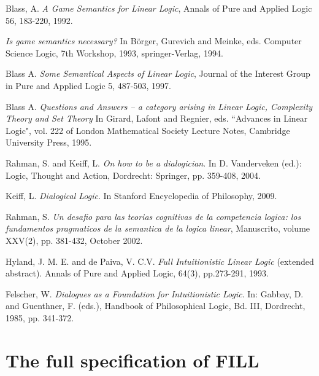 \documentclass{article}
\begin{document}


%
%



 \begin{thebibliography}{000}


 Blass, A. {\it A Game Semantics for Linear Logic}, Annals of Pure and 
Applied Logic 56, 183-220, 1992. 

 {\it Is game semantics necessary?} In B\"orger, Gurevich and Meinke, eds. Computer Science Logic, 7th Workshop, 1993, springer-Verlag, 1994.

 Blass A. {\it Some Semantical Aspects of Linear Logic}, Journal of the 
Interest Group in Pure and Applied Logic 5, 487-503, 1997.

  Blass A. {\it Questions and Answers -- a category arising in Linear Logic, Complexity Theory and Set Theory} In Girard, Lafont and Regnier,  eds. ``Advances in Linear Logic", vol. 222 of London Mathematical Society Lecture Notes, Cambridge University Press, 1995.

 Rahman, S. and Keiff, L. {\it On how to be a dialogician}. In D. Vanderveken (ed.): Logic, Thought and Action, Dordrecht: Springer, pp. 359-408, 2004.

 Keiff, L. {\it Dialogical Logic}. In Stanford Encyclopedia of Philosophy, 2009.

 Rahman, S. {\it Un desafio para las  teorias cognitivas de la competencia logica: los fundamentos pragmaticos de la semantica de la logica linear}, Manuscrito, volume XXV(2), pp. 381-432, October 2002. 

 Hyland, J. M. E. and de Paiva, V. C.V. {\it Full Intuitionistic Linear Logic} (extended abstract). Annals of Pure and Applied Logic, 64(3), pp.273-291, 1993.

Felscher, W. {\it Dialogues as a Foundation for Intuitionistic 
Logic}. In: Gabbay, D. and  Guenthner, F. (eds.), Handbook of 
Philosophical Logic, Bd. III, Dordrecht, 1985, pp. 341-372. 

\end{thebibliography}

\appendix

\section{The full specification of FILL}
\label{sec:fill_specification}
\FILLall{}
\end{document}
